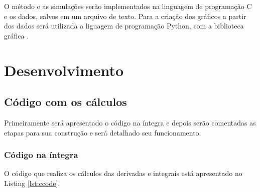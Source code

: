 \documentclass[
	12pt,				%
	openany,			%
	twoside,			%
	a4paper,			%
	english,			%
	french,				%
	spanish,			%
	brazil,				%
	]{abntex2}
\begin{document}
O método e as simulações serão implementados na linguagem de programação C e os dados, salvos em um arquivo de texto. Para a criação dos gráficos a partir dos dados será utilizada a liguagem de programação Python, com a biblioteca gráfica .

\chapter{Desenvolvimento}
\section{Código com os cálculos}
Primeiramente será apresentado o código na íntegra e depois serão comentadas as etapas para sua construção e será detalhado seu funcionamento.
\subsection{Código na íntegra}
O código que realiza os cálculos das derivadas e integrais está apresentado no Listing \ref{lst:ccode}.
\end{document}
